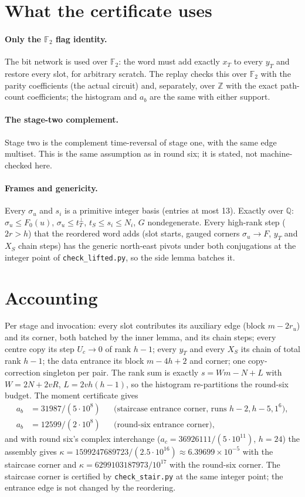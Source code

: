 \documentclass[11pt]{article}
\theoremstyle{remark}\newtheorem*{remark}{Remark}
\begin{document}
\section{What the certificate uses}
\paragraph{Only the $\mathbb F_2$ flag identity.} The bit network is used over $\mathbb F_2$: the word must add exactly
$x_T$ to every $y_T$ and restore every slot, for arbitrary scratch. The replay checks this over $\mathbb F_2$ with
the parity coefficients (the actual circuit) and, separately, over $\mathbb Z$ with the exact path-count
coefficients; the histogram and $a_b$ are the same with either support.

\paragraph{The stage-two complement.} Stage two is the complement time-reversal of stage one, with the same edge
multiset. This is the same assumption as in round six; it is stated, not machine-checked here.

\paragraph{Frames and genericity.} Every $\sigma_u$ and $s_i$ is a primitive integer basis (entries at most 13).
Exactly over $\mathbb Q$: $\sigma_u\le F_0(u)$, $\sigma_u\le t_T^\perp$, $t_S\le s_i\le N_i$, $G$ nondegenerate. Every
high-rank step ($2r>h$) that the reordered word adds (slot starts, gauged corners $\sigma_u\to F$, $y_T$ and $X_S$
chain steps) has the generic north-east pivots under both conjugations at the integer point of
\texttt{check\_lifted.py}, so the side lemma batches it.

\section{Accounting}
Per stage and invocation: every slot contributes its auxiliary edge (block $m-2r_u$) and its corner, both batched
by the inner lemma, and its chain steps; every centre copy its step $U_c\to0$ of rank $h-1$; every $y_T$ and every
$X_S$ its chain of total rank $h-1$; the data entrance its block $m-4h+2$ and corner; one copy-correction singleton per
pair. The rank sum is exactly $s=Wm-N+L$ with $W=2N+2vR$, $L=2vh(h-1)$, so the histogram re-partitions the round-six
budget. The moment certificate gives
\begin{align*}
 a_b&=31987/(5\cdot10^8) &&\text{(staircase entrance corner, runs $h-2,h-5,1^6$)},\\
 a_b&=12599/(2\cdot10^8) &&\text{(round-six entrance corner)},
\end{align*}
and with round six's complex interchange ($a_c=36926111/(5\cdot10^{11})$, $h=24$) the assembly gives
$\kappa=1599247689723/(2.5\cdot10^{16})\approx6.39699\times10^{-5}$ with the staircase corner and
$\kappa=6299103187973/10^{17}$ with the round-six corner. The staircase corner is certified by
\texttt{check\_stair.py} at the same integer point; the entrance edge is not changed by the reordering.
\end{document}
